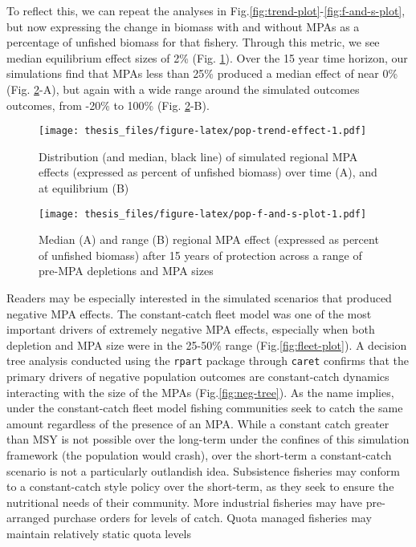 \documentclass[twoside,12pt,final]{ucthesis-CA2012}
\begin{document}
\begin{ucmainmatter}
To reflect this, we can repeat the analyses in
Fig.\ref{fig:trend-plot}-\ref{fig:f-and-s-plot}, but now expressing the
change in biomass with and without MPAs as a percentage of unfished
biomass for that fishery. Through this metric, we see median equilibrium
effect sizes of 2\% (Fig. \ref{fig:pop-trend-effect}). Over the 15 year
time horizon, our simulations find that MPAs less than 25\% produced a
median effect of near 0\% (Fig. \ref{fig:pop-f-and-s-plot}-A), but again
with a wide range around the simulated outcomes outcomes, from -20\% to
100\% (Fig. \ref{fig:pop-f-and-s-plot}-B).
\begin{figure}
\centering
\texttt{[image: thesis\_files/figure-latex/pop-trend-effect-1.pdf]}
\caption{\label{fig:pop-trend-effect}Distribution (and median, black line)
of simulated regional MPA effects (expressed as percent of unfished
biomass) over time (A), and at equilibrium (B)}
\end{figure}
\begin{figure}
\centering
\texttt{[image: thesis\_files/figure-latex/pop-f-and-s-plot-1.pdf]}
\caption{\label{fig:pop-f-and-s-plot}Median (A) and range (B) regional MPA
effect (expressed as percent of unfished biomass) after 15 years of
protection across a range of pre-MPA depletions and MPA sizes}
\end{figure}
Readers may be especially interested in the simulated scenarios that
produced negative MPA effects. The constant-catch fleet model was one of
the most important drivers of extremely negative MPA effects, especially
when both depletion and MPA size were in the 25-50\% range
(Fig.\ref{fig:fleet-plot}). A decision tree analysis conducted using the
\texttt{rpart} package through \texttt{caret} confirms that the primary
drivers of negative population outcomes are constant-catch dynamics
interacting with the size of the MPAs (Fig.\ref{fig:neg-tree}). As the
name implies, under the constant-catch fleet model fishing communities
seek to catch the same amount regardless of the presence of an MPA.
While a constant catch greater than MSY is not possible over the
long-term under the confines of this simulation framework (the
population would crash), over the short-term a constant-catch scenario
is not a particularly outlandish idea. Subsistence fisheries may conform
to a constant-catch style policy over the short-term, as they seek to
ensure the nutritional needs of their community. More industrial
fisheries may have pre-arranged purchase orders for levels of catch.
Quota managed fisheries may maintain relatively static quota levels

\end{ucmainmatter}
\end{document}
